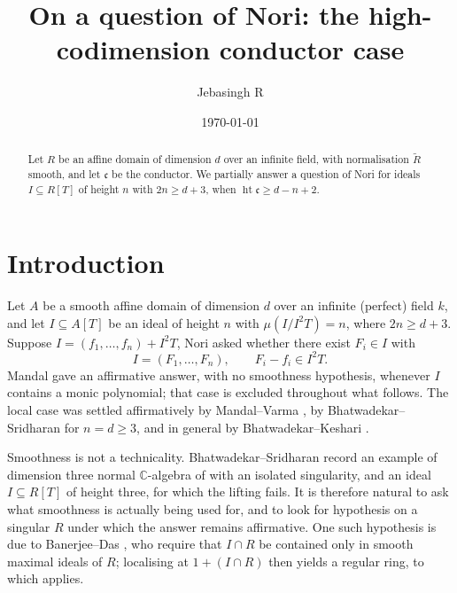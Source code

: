 \documentclass[11pt,reqno]{amsart}
\theoremstyle{plain}
\theoremstyle{definition}
\newcommand{\hgt}{\operatorname{ht}}
\newcommand{\Rt}{\widetilde{R}}
\newcommand{\cc}{\mathfrak{c}}
\begin{document}
\title[Nori's question and the conductor]{On a question of Nori: the high-codimension conductor case}

\author{Jebasingh R}
\date{\today}
\address{Department of Mathematics, Indian Insitute of Technology Madras, Chennai, Tamil Nadu 600036}
\keywords{}

\begin{abstract}
Let $R$ be an affine domain of dimension $d$ over an infinite field, with normalisation
$\Rt$ smooth, and let $\cc$ be the conductor. We partially answer a question of Nori
 for ideals $I\subseteq R[T]$ of height $n$ with $2n\ge d+3$, when $\hgt\cc\ge d-n+2$. 
\end{abstract}

\maketitle

\section{Introduction}

Let $A$ be a smooth affine domain of dimension $d$ over an infinite (perfect) field $k$, and let
$I\subseteq A[T]$ be an ideal of height $n$ with $\mu(I/I^2T)=n$, where $2n\ge d+3$. Suppose $I=(f_1,\dots,f_n)+I^2T$, Nori asked \cite[Appendix]{Man92} whether there exist
$F_i\in I$ with
\[
I=(F_1,\dots,F_n),\qquad F_i-f_i\in I^2T .
\]
 Mandal \cite{Man92} gave an affirmative answer, with no smoothness
hypothesis, whenever $I$ contains a monic polynomial; that case is excluded throughout what follows.
The local case was settled affirmatively by Mandal--Varma \cite{MV97}, by
Bhatwadekar--Sridharan \cite{BS98} for $n=d\ge 3$, and in general by Bhatwadekar--Keshari
\cite{BK03}.

Smoothness is not a technicality. Bhatwadekar--Sridharan record an example of dimension three normal $\mathbb{C}$-algebra of with an isolated singularity, and an ideal $I\subseteq R[T]$ of height three, for which
the lifting fails. It is therefore natural to ask what smoothness is actually being used for,
and to look for hypothesis on a singular $R$ under which the answer remains affirmative. One
such hypothesis is due to Banerjee--Das \cite[Theorem 4.5]{BD}, who require that
$I\cap R$ be contained only in smooth maximal ideals of $R$; localising at $1+(I\cap R)$ then
yields a regular ring, to which \cite{BK03} applies.
\end{document}

